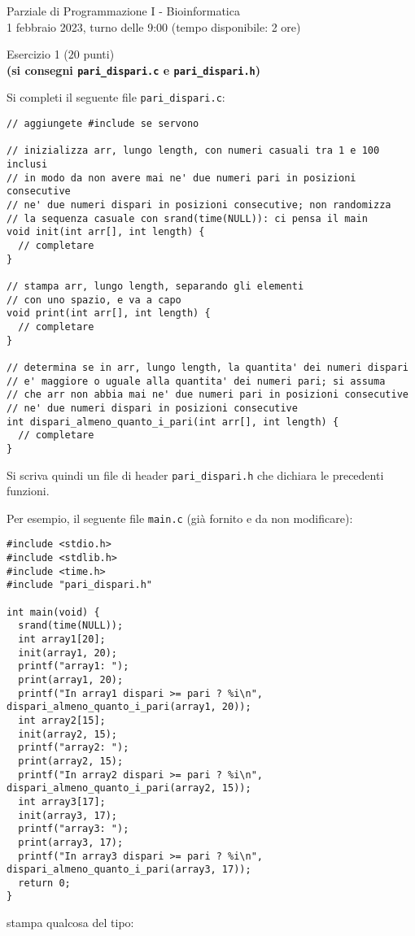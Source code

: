 \documentclass[12pt]{article}
\begin{document}
\begin{center}{\LARGE Parziale di Programmazione I - Bioinformatica}\\
  \large 1 febbraio 2023, turno delle 9:00 (tempo disponibile: 2 ore)
\end{center}

\vspace*{1ex}
\begin{center}{\Large Esercizio 1} ($20$ punti)\\
  \textbf{(si consegni \texttt{pari\_dispari.c} e \texttt{pari\_dispari.h})}
\end{center}

Si completi il seguente file \texttt{pari\_dispari.c}:

\begin{center}
\begin{lstlisting}[language=myC]
// aggiungete #include se servono

// inizializza arr, lungo length, con numeri casuali tra 1 e 100 inclusi
// in modo da non avere mai ne' due numeri pari in posizioni consecutive
// ne' due numeri dispari in posizioni consecutive; non randomizza
// la sequenza casuale con srand(time(NULL)): ci pensa il main
void init(int arr[], int length) {
  // completare
}

// stampa arr, lungo length, separando gli elementi
// con uno spazio, e va a capo
void print(int arr[], int length) {
  // completare
}

// determina se in arr, lungo length, la quantita' dei numeri dispari
// e' maggiore o uguale alla quantita' dei numeri pari; si assuma
// che arr non abbia mai ne' due numeri pari in posizioni consecutive
// ne' due numeri dispari in posizioni consecutive
int dispari_almeno_quanto_i_pari(int arr[], int length) {
  // completare
}
\end{lstlisting}
\end{center}
%
Si scriva quindi un file di header \texttt{pari\_dispari.h} che dichiara le precedenti funzioni.

Per esempio, il seguente file \texttt{main.c}
(gi\`a fornito e da non modificare):

\begin{center}
  \begin{lstlisting}[language=myC]
#include <stdio.h>
#include <stdlib.h>
#include <time.h>
#include "pari_dispari.h"

int main(void) {
  srand(time(NULL));
  int array1[20];
  init(array1, 20);
  printf("array1: ");
  print(array1, 20);
  printf("In array1 dispari >= pari ? %i\n", dispari_almeno_quanto_i_pari(array1, 20));
  int array2[15];
  init(array2, 15);
  printf("array2: ");
  print(array2, 15);
  printf("In array2 dispari >= pari ? %i\n", dispari_almeno_quanto_i_pari(array2, 15));
  int array3[17];
  init(array3, 17);
  printf("array3: ");
  print(array3, 17);
  printf("In array3 dispari >= pari ? %i\n", dispari_almeno_quanto_i_pari(array3, 17));
  return 0;
}
  \end{lstlisting}
\end{center}
stampa qualcosa del tipo:
\end{document}
